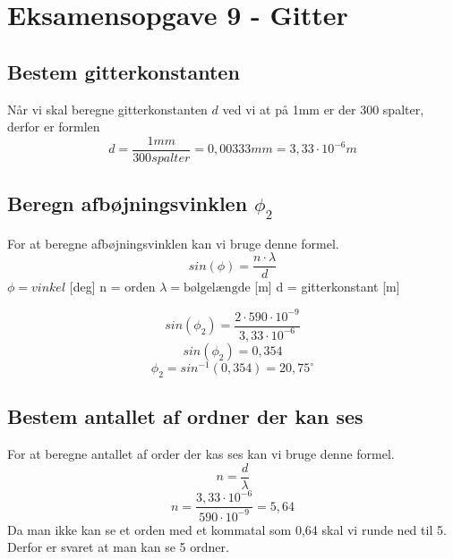 \newpage
\section{Eksamensopgave 9 - Gitter}
\subsection{Bestem gitterkonstanten}
Når vi skal beregne gitterkonstanten \begin{math}d\end{math} ved vi at på 1mm er der 300 spalter, derfor er formlen
\begin{equation*}
    d=\frac{1mm}{300 spalter} = 0,00333mm = 3,33 \cdot 10^{-6} m
\end{equation*}


\subsection{Beregn afbøjningsvinklen \begin{math}\phi_{2}\end{math}}
For at beregne afbøjningsvinklen kan vi bruge denne formel.
\begin{equation*}
    sin(\phi)=\frac{n\cdot\lambda}{d}
\end{equation*}
\begin{math}\phi = vinkel\end{math} [deg]\newline
n = orden\newline
\begin{math}\lambda = \text{bølgelængde}\end{math} [m]\newline
d = gitterkonstant [m]\newline

\begin{equation*}
    sin(\phi_{2})=\frac{2\cdot 590\cdot 10^{-9}}{3,33\cdot 10^{-6}}
\end{equation*}
\begin{equation*}
    sin(\phi_{2})=0,354
\end{equation*}
\begin{equation*}
    \phi_{2}=sin^{-1}(0,354)=20,75^{\circ}
\end{equation*}
\subsection{Bestem antallet af ordner der kan ses}
For at beregne antallet af order der kas ses kan vi bruge denne formel.
\begin{equation*}
    n=\frac{d}{\lambda}
\end{equation*}
\begin{equation*}
    n=\frac{3,33\cdot 10^{-6}}{590\cdot 10^{-9}} = 5,64
\end{equation*}
Da man ikke kan se et orden med et kommatal som 0,64 skal vi runde ned til 5. Derfor er svaret at man kan se 5 ordner.

\newpage